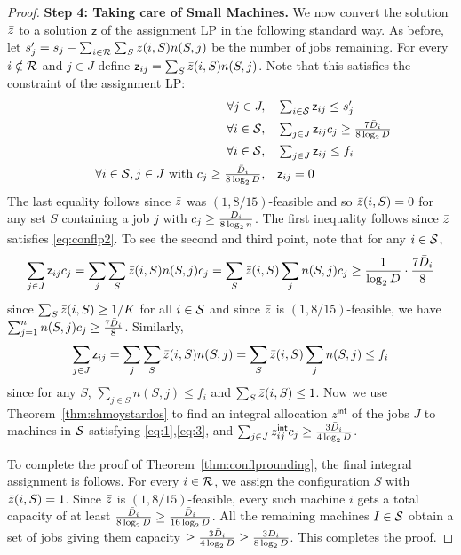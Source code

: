 \begin{proof}
\noindent
{\bf Step 4: Taking care of Small Machines.} 
\def\zz{z^{\mathsf{int}}}
\def\2z{\mathsf z}
We now convert the solution $\bar z$  to a solution $\2z$ of the assignment LP in the following standard way.
As before, let $s'_j = s_j - \sum_{i\in {\cal R}}\sum_S \bar z(i,S)n(S,j)$ be the number of jobs remaining.
For every $i\notin {\cal R}$ and $j\in J$ define $\2z_{ij} = \sum_{S}\z(i,S)n(S,j)$.  Note that this satisfies the constraint of the assignment LP:
	\begin{alignat}{4}
		&& \quad \forall j \in J,   &\quad  \textstyle \sum_{i\in \calS} \2z_{ij}  \leq  s'_j \label{eq:1} \\
		&& \quad \forall i\in \calS ,      &\quad  \textstyle \sum_{j\in J}  \2z_{ij}c_j \geq \frac{7\barD_i}{8\log_2 D} \label{eq:2} \\
	&& \quad \forall i\in \calS ,      &\quad  \textstyle \sum_{j\in J}  \2z_{ij} \leq f_i \label{eq:3} \\ 
		&& \quad \forall i\in \calS, j\in J~\textrm{with}~ \textstyle c_j \geq \frac{\barD_i}{8\log_2 D}, & \quad \2z_{ij}   =  0  \label{eq:4} 
	\end{alignat}
	The last equality follows since $\bar z$ was $(1,8/15)$-feasible and so $\bar z(i,S) = 0$ for any set $S$ containing a job $j$ with $c_j \geq \frac{\bar{D}_i}{8\log_2 n}$.
The first inequality follows  since $\bar z$ satisfies \eqref{eq:conflp2}. To see the second and third point, note 
that for any $i\in {\cal S}$,
\[
\sum_{j\in J} \2z_{ij}c_j = \sum_j \sum_S \z(i,S)n(S,j)c_j = \sum_S \z(i,S) \sum_j n(S,j)c_j \geq \frac{1}{\log_2 D}\cdot \frac{7\barD_i}{8}
\]
	since $\sum_S \bar z(i,S) \geq 1/K$ for all $i\in {\cal S}$ and since $\bar z$ is $(1,8/15)$-feasible, we have $\sum_{j=1}^n n(S,j) c_j \geq \frac{7\bar{D}_i}{8}$. Similarly,
\[
\sum_{j\in J} \2z_{ij} = \sum_j \sum_S \z(i,S)n(S,j) = \sum_S \z(i,S) \sum_j n(S,j) \leq f_i
\]
since for any $S$, $\sum_{j\in S} n(S,j) \leq f_i$ and $\sum_S \bar z(i,S) \leq 1$.
Now we use Theorem~\ref{thm:shmoystardos} to find an integral allocation $\zz$ of the jobs $J$ to machines in ${\cal S}$ satisfying \eqref{eq:1},\eqref{eq:3}, and $\sum_{j\in J} \zz_{ij}c_j \geq \frac{3\barD_i}{4\log_2 D}$. \medskip

To complete the proof of Theorem~\ref{thm:conflprounding}, the final integral assignment is follows. For every $i\in {\cal R}$, we assign the configuration $S$ with $\bar z(i,S) = 1$.
Since $\bar z$ is $(1,8/15)$-feasible, every such machine $i$ gets a total capacity of at least $\frac{\bar{D}_i}{8\log_2 D} \geq \frac{\bar{D}_i}{16\log_2 D}$.
All the remaining machines $I\in {\cal S}$ obtain a set of jobs giving them capacity $\geq \frac{3\bar{D}_i}{4\log_2 D} \geq \frac{3D_i}{8\log_2 D}$.
This completes the proof.
\end{proof}


